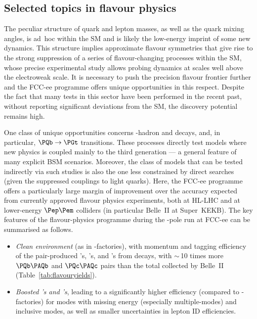 \subsection{Selected topics in flavour physics}
\label{sec:PhysicsCaseFlavour}

The peculiar structure of quark and lepton masses, as well as the quark mixing angles, 
is ad~hoc within the SM and is likely the low-energy imprint of some new dynamics. 
This structure implies approximate flavour symmetries that give rise to the strong suppression 
of a series of flavour-changing processes within the SM,  
whose precise experimental study allows probing dynamics at scales well above the electroweak scale.  
It is necessary to push the precision flavour frontier further and the FCC-ee programme offers unique opportunities in this respect.
Despite the fact that many tests in this sector have been performed in the recent past, 
without reporting significant deviations from the SM, the discovery potential remains high.

One class of unique opportunities concerns \PQb-hadron and \PGt decays, and, in particular, $\PQb \to \PGt$ transitions. 
These processes directly test models where 
new physics is coupled mainly to the third generation 
--- a general feature of many explicit BSM scenarios. 
Moreover, the class of models that can be tested indirectly via such studies 
is also the one less constrained by direct searches (given the suppressed couplings to light quarks). 
Here, the FCC-ee programme offers a particularly large margin of improvement 
over the accuracy expected from currently approved flavour physics experiments, 
both at HL-LHC and at lower-energy $\epem$ colliders (in particular Belle~II at Super~KEKB).
The key features of the flavour-physics programme during the \PZ-pole run at FCC-ee can be summarised as follows.

\begin{itemize}
\item \emph{Clean environment} (as in \PB-factories), 
with momentum and tagging efficiency of the pair-produced \PQb's, \PQc's, and \PGt's from \PZ decays, 
with $\sim$\,10 times more $\bbbar$ and $\ccbar$ pairs than the total collected by Belle~II (Table~\ref{tab:flavouryields}).
\item \emph{Boosted \PQb's and \PGt's}, leading to a significantly higher efficiency (compared to \PB-factories) 
for modes with missing energy (especially multiple-\PGn modes) and inclusive modes, 
as well as smaller uncertainties in lepton ID efficiencies.  
\end{itemize}

